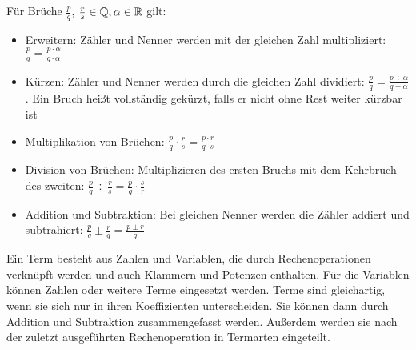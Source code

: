 \begin{satz}
	Für Brüche $\frac{p}{q}$, $\frac{r}{s} \in \mathbb{Q}, \alpha \in \mathbb{R} $ gilt:
	\begin{itemize}[noitemsep]
		\item Erweitern: Zähler und Nenner werden mit der gleichen Zahl multipliziert: $\frac{p}{q} = \frac{p \cdot \alpha}{q \cdot \alpha}$
		\item Kürzen: Zähler und Nenner werden durch die gleichen Zahl dividiert: $\frac{p }{q} = \frac{p \div \alpha}{q \div \alpha}$. Ein Bruch heißt vollständig gekürzt, falls er nicht ohne Rest weiter kürzbar ist
		\item Multiplikation von Brüchen: $\frac{p}{q} \cdot \frac{r}{s} = \frac{p \cdot r}{q \cdot s}$
		\item Division von Brüchen: Multiplizieren des ersten Bruchs mit dem Kehrbruch des zweiten: $\frac{p}{q} \div \frac{r}{s} = \frac{p}{q} \cdot \frac{s}{r}$
		\item Addition und Subtraktion: Bei gleichen Nenner werden die Zähler addiert und subtrahiert: $\frac{p}{q} \pm \frac{r}{q} = \frac{p \pm r}{q}$
	\end{itemize}
\end{satz}

\begin{definition}
	Ein Term besteht aus Zahlen und Variablen, die durch Rechenoperationen verknüpft werden und auch Klammern und Potenzen enthalten. Für die Variablen können Zahlen oder weitere Terme eingesetzt werden. Terme sind gleichartig, wenn sie sich nur in ihren Koeffizienten unterscheiden. Sie können dann durch Addition und Subtraktion zusammengefasst werden. Außerdem werden sie nach der zuletzt ausgeführten Rechenoperation in Termarten eingeteilt.
\end{definition}

